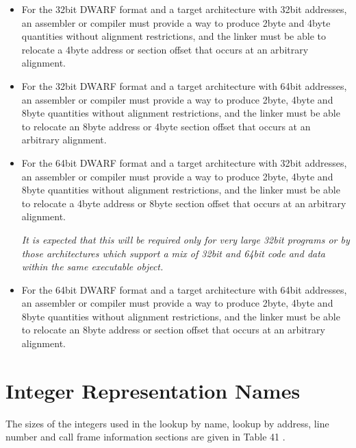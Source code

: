 \begin{itemize}
\item For the 32\dash bit DWARF format and a target architecture with
32\dash bit addresses, an assembler or compiler must provide a way
to produce 2\dash byte and 4\dash byte quantities without alignment
restrictions, and the linker must be able to relocate a
4\dash byte address or section offset that occurs at an arbitrary
alignment.

\item For the 32\dash bit DWARF format and a target architecture with
64\dash bit addresses, an assembler or compiler must provide a
way to produce 2\dash byte, 4\dash byte and 8\dash byte quantities without
alignment restrictions, and the linker must be able to relocate
an 8\dash byte address or 4\dash byte section offset that occurs at an
arbitrary alignment.

\item For the 64\dash bit DWARF format and a target architecture with
32\dash bit addresses, an assembler or compiler must provide a
way to produce 2\dash byte, 4\dash byte and 8\dash byte quantities without
alignment restrictions, and the linker must be able to relocate
a 4\dash byte address or 8\dash byte section offset that occurs at an
arbitrary alignment.

\textit{It is expected that this will be required only for very large
32\dash bit programs or by those architectures which support
a mix of 32\dash bit and 64\dash bit code and data within the same
executable object.}

\item For the 64\dash bit DWARF format and a target architecture with
64\dash bit addresses, an assembler or compiler must provide a
way to produce 2\dash byte, 4\dash byte and 8\dash byte quantities without
alignment restrictions, and the linker must be able to
relocate an 8\dash byte address or section offset that occurs at
an arbitrary alignment.
\end{itemize}

\section{Integer Representation Names}
\label{datarep:integerrepresentationnames}

The sizes of the integers used in the lookup by name, lookup
by address, line number and call frame information sections
are given in
Table 41 .

